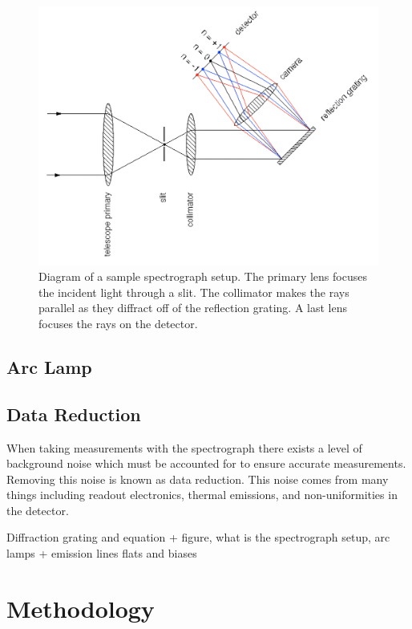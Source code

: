 \documentclass[a4paper,12pt,twocolumn]{article}
\let\cite=\supercite
\begin{document}
			\begin{figure}
				\includegraphics[width=\columnwidth]{spectrograph_refl-transformed.png}
				\captionsetup{font=scriptsize}
				\caption{Diagram of a sample spectrograph setup\cite{vik}. The primary lens focuses the incident light through a slit. The collimator makes the rays parallel as they diffract off of the reflection grating. A last lens focuses the rays on the detector.}
				\label{fig:spectrograph}
			\end{figure}
		
		\subsection{Arc Lamp}
			
		\subsection{Data Reduction}
			When taking measurements with the spectrograph there exists a level of background noise which must be accounted for to ensure accurate measurements. Removing this noise is known as data reduction\cite{manual}. This noise comes from many things including readout electronics, thermal emissions, and non-uniformities in the detector\cite{astropy}.
			
		Diffraction grating and equation + figure, what is the spectrograph setup, arc lamps + emission lines
		flats and biases
	
	\section{Methodology}
\end{document}
